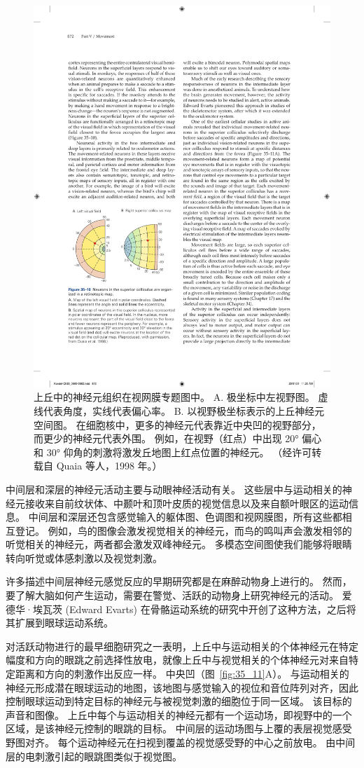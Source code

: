 \begin{figure}[htbp]
	\centering
	\includegraphics[width=0.5\linewidth]{chap35/fig_35_10}
	\caption{上丘中的神经元组织在视网膜专题图中。 A. 极坐标中左视野图。 虚线代表角度，实线代表偏心率。 B. 以视野极坐标表示的上丘神经元空间图。 在细胞核中，更多的神经元代表靠近中央凹的视野部分，而更少的神经元代表外围。 例如，在视野（红点）中出现 20° 偏心和 30° 仰角的刺激将激发丘地图上红点位置的神经元。 （经许可转载自 Quaia 等人，1998 年。）}
	\label{fig:35_10}
\end{figure}


中间层和深层的神经元活动主要与动眼神经活动有关。
这些层中与运动相关的神经元接收来自前纹状体、中颞叶和顶叶皮质的视觉信息以及来自额叶眼区的运动信息。
中间层和深层还包含感觉输入的躯体图、色调图和视网膜图，所有这些都相互登记。
例如，鸟的图像会激发视觉相关的神经元，而鸟的鸣叫声会激发相邻的听觉相关的神经元，两者都会激发双峰神经元。
多模态空间图使我们能够将眼睛转向听觉或体感刺激以及视觉刺激。


许多描述中间层神经元感觉反应的早期研究都是在麻醉动物身上进行的。
然而，要了解大脑如何产生运动，需要在警觉、活跃的动物身上研究神经元的活动。
爱德华·埃瓦茨 (Edward Evarts) 在骨骼运动系统的研究中开创了这种方法，之后将其扩展到眼球运动系统。


对活跃动物进行的最早细胞研究之一表明，上丘中与运动相关的个体神经元在特定幅度和方向的眼跳之前选择性放电，就像上丘中与视觉相关的个体神经元对来自特定距离和方向的刺激作出反应一样。
中央凹（图~\ref{fig:35_11}A）。
与运动相关的神经元形成潜在眼球运动的地图，该地图与感觉输入的视位和音位阵列对齐，因此控制眼球运动到特定目标的神经元与被视觉刺激的细胞位于同一区域。
该目标的声音和图像。
上丘中每个与运动相关的神经元都有一个运动场，即视野中的一个区域，是该神经元控制的眼跳的目标。
中间层的运动场图与上覆的表层视觉感受野图对齐。
每个运动神经元在扫视到覆盖的视觉感受野的中心之前放电。
由中间层的电刺激引起的眼跳图类似于视觉图。


